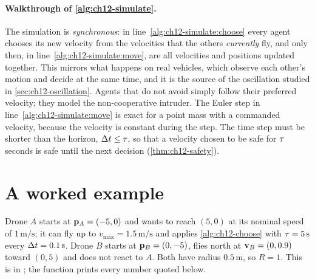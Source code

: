 \paragraph{Walkthrough of \cref{alg:ch12-simulate}.}
The simulation is \emph{synchronous}: in line~\ref{alg:ch12-simulate:choose}
every agent chooses its new velocity from the velocities that the others
\emph{currently} fly, and only then, in line~\ref{alg:ch12-simulate:move}, are
all velocities and positions updated together. This mirrors what happens on
real vehicles, which observe each other's motion and decide at the same time,
and it is the source of the oscillation studied in
\cref{sec:ch12-oscillation}. Agents that do not avoid simply follow their
preferred velocity; they model the non-cooperative intruder. The Euler step in
line~\ref{alg:ch12-simulate:move} is exact for a point mass with a commanded velocity,
because the velocity is constant during the step. The time step must be
shorter than the horizon, $\Delta t \le \tau$, so that a velocity chosen to be
safe for $\tau$ seconds is safe until the next decision
(\cref{thm:ch12-safety}).

\section{A worked example}
\label{sec:ch12-example}

\begin{example}
\label{ex:ch12-crossing}
Drone $A$ starts at $\mathbf{p}_A = (-5, 0)$ and wants to reach $(5, 0)$ at its
nominal speed of $1\,\mathrm{m/s}$; it can fly up to $v_{\max} = 1.5\,\mathrm{m/s}$
and applies \cref{alg:ch12-choose} with $\tau = 5\,\mathrm{s}$ every
$\Delta t = 0.1\,\mathrm{s}$. Drone $B$ starts at $\mathbf{p}_B = (0,-5)$, flies north at
$\mathbf{v}_B = (0, 0.9)$ toward $(0, 5)$ and does not react to $A$. Both have radius
$0.5\,\mathrm{m}$, so $R = 1$. This is  in
; the function 
prints every number quoted below.
\end{example}

